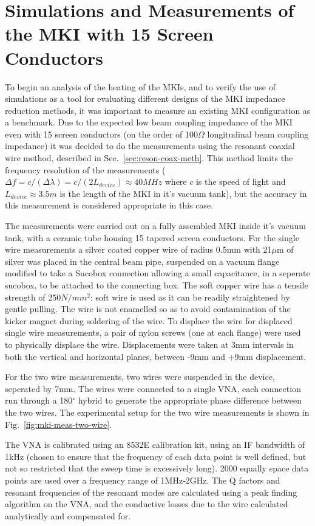 \section{Simulations and Measurements of the MKI with 15 Screen Conductors}

To begin an analysis of the heating of the MKIs, and to verify the use of simulations as a tool for evaluating different designs of the MKI impedance reduction methods, it was important to measure an existing MKI configuration as a benchmark. Due to the expected low beam coupling impedance of the MKI even with 15 screen conductors (on the order of 100$\Omega$ longitudinal beam coupling impedance) it was decided to do the measurements using the resonant coaxial wire method, described in Sec.~\ref{sec:reson-coax-meth}. This method limits the frequency resolution of the measurements ($\Delta{} f = c/ (\Delta \lambda) = c/(2L_{device}) \approx 40MHz$ where $c$ is the speed of light and $L_{device}\approx 3.5m$ is the length of the MKI in it's vacuum tank), but the accuracy in this measurement is considered appropriate in this case.

The measurements were carried out on a fully assembled MKI inside it's vacuum tank, with a ceramic tube housing 15 tapered screen conductors. For the single wire measurements a silver coated copper wire of radius 0.5mm with 21$\mu$m of silver was placed in the central beam pipe, suspended on a vacuum flange modified to take a Sucobox connection allowing a small capacitance, in a seperate sucobox, to be attached to the connecting box. The soft copper wire has a tensile strength of 250$N/mm^{2}$: soft wire is used as it can be readily straightened by gentle pulling. The wire is not enamelled so as to avoid contamination of the kicker magnet during soldering of the wire. To displace the wire for displaced single wire measurements, a pair of nylon screws (one at each flange) were used to physically displace the wire. Displacements were taken at 3mm intervals in both the vertical and horizontal planes, between -9mm and +9mm displacement.

For the two wire measurements, two wires were suspended in the device, seperated by 7mm. The wires were connected to a single VNA, each connection run through a 180$^{\circ}$ hybrid to generate the appropriate phase difference between the two wires. The experimental setup for the two wire measurements is shown in Fig.~\ref{fig:mki-meas-two-wire}.

The VNA is calibrated using an 8532E calibration kit, using an IF bandwidth of 1kHz (chosen to ensure that the frequency of each data point is well defined, but not so restricted that the sweep time is excessively long). 2000 equally space data points are used over a frequency range of 1MHz-2GHz. The Q factors and resonant frequencies of the resonant modes are calculated using a peak finding algorithm on the VNA, and the conductive losses due to the wire calculated analytically and compensated for.

